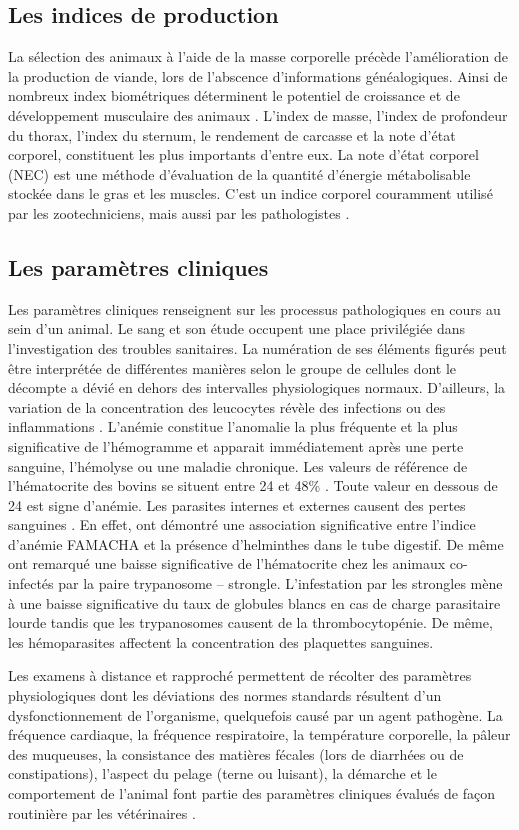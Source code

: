 \subsection{Les indices de production}
La sélection des animaux à l'aide de la masse corporelle précède l'amélioration de la 
production de viande, lors de l'abscence d'informations généalogiques. Ainsi de nombreux 
index biométriques déterminent le potentiel de croissance et de développement musculaire 
des animaux . L'index de masse, l'index de profondeur du thorax, l'index 
du sternum, le rendement de carcasse et la note d'état corporel, constituent les plus 
importants d'entre eux. La note d'état corporel (NEC) est une méthode d'évaluation de 
la quantité d'énergie métabolisable stockée dans le gras et les muscles. C'est un 
indice corporel couramment utilisé par les zootechniciens, mais aussi par les 
pathologistes .

\subsection{Les paramètres cliniques}
Les paramètres cliniques renseignent sur les processus pathologiques en cours au sein 
d'un animal.
Le sang et son étude occupent une place privilégiée dans l'investigation des troubles 
sanitaires. La numération de ses éléments figurés peut être interprétée de différentes 
manières selon le groupe de cellules dont le décompte a dévié en dehors des intervalles 
physiologiques normaux. D'ailleurs, la variation de la concentration des leucocytes 
révèle  des infections ou des inflammations .
L'anémie constitue l'anomalie la plus fréquente et la plus significative de l'hémogramme 
et apparait immédiatement après une perte sanguine, l'hémolyse ou une maladie chronique. 
Les valeurs de référence de l'hématocrite des bovins se situent entre 24 et 48\% 
. Toute valeur en dessous de 24 est signe d'anémie. Les parasites 
internes et externes causent des pertes sanguines . En effet, 
 ont démontré une association significative entre l'indice d'anémie 
FAMACHA\textsuperscript{\circledR} et la présence d'helminthes dans le tube digestif. 
De même  ont remarqué une baisse significative de l'hématocrite chez 
les animaux co-infectés par la paire trypanosome – strongle. L'infestation par les 
strongles mène à une baisse significative du taux de globules blancs en cas de charge 
parasitaire lourde tandis que les trypanosomes causent de la thrombocytopénie. De même, 
les hémoparasites affectent la concentration des plaquettes sanguines.
\par Les examens à distance et rapproché permettent de récolter des paramètres 
physiologiques dont les déviations des normes standards résultent d'un dysfonctionnement 
de l'organisme, quelquefois causé par un agent pathogène. La fréquence cardiaque, 
la fréquence respiratoire, la température corporelle, la pâleur des muqueuses, la 
consistance des matières fécales (lors de diarrhées ou de constipations), l'aspect 
du pelage (terne ou luisant), la démarche et le comportement de l'animal font partie 
des paramètres cliniques évalués de façon routinière par les vétérinaires .

